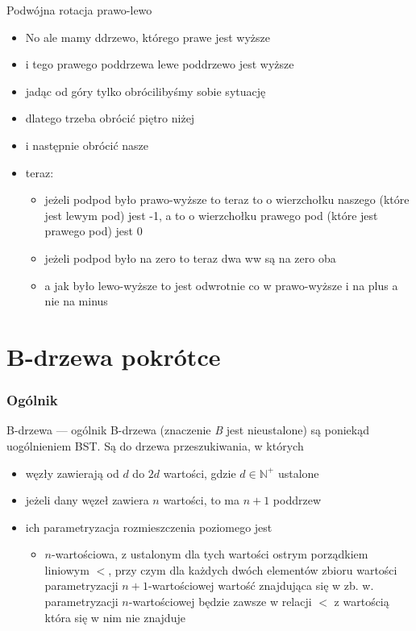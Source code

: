 \documentclass{beamer}
\begin{document}
\begin{frame}{Podwójna rotacja prawo-lewo}
\begin{itemize}
	\item No ale mamy ddrzewo, którego prawe jest wyższe
    \item i tego prawego poddrzewa lewe poddrzewo jest wyższe
    \pause\vskip 0.4cm
    \item jadąc od góry tylko obrócilibyśmy sobie sytuację
    \pause\vskip 0.2cm
    \item dlatego trzeba obrócić piętro niżej
    \item i następnie obrócić nasze
    \pause\vskip 0.4cm
    \item teraz:
    \begin{itemize}
    	\item jeżeli podpod było prawo-wyższe to teraz to o wierzchołku naszego (które jest lewym pod) jest -1, a to o wierzchołku prawego pod (które jest prawego pod) jest 0
        \item jeżeli podpod było na zero to teraz dwa ww są na zero oba
        \item a jak było lewo-wyższe to jest odwrotnie co w prawo-wyższe i na plus a nie na minus
    \end{itemize}
\end{itemize}
\end{frame}

\section{B-drzewa pokrótce}

\subsubsection{Ogólnik}

\begin{frame}{B-drzewa --- ogólnik}
	B-drzewa (znaczenie \textit{B} jest nieustalone) są poniekąd uogólnieniem BST.
    Są do drzewa przeszukiwania, w których
    \begin{itemize}
    	\item węzły zawierają od $d$ do $2d$ wartości, gdzie $d\in\mathbb{N}^+$ ustalone
        \item jeżeli dany węzeł zawiera $n$ wartości, to ma $n+1$ poddrzew
        \item ich parametryzacja rozmieszczenia poziomego jest
        \begin{itemize}
        	\item $n$-wartościowa, z ustalonym dla tych wartości ostrym porządkiem
            liniowym $<$, przy czym dla każdych dwóch elementów zbioru wartości parametryzacji 
            $n+1$-wartościowej wartość znajdująca się w zb. w. parametryzacji
            $n$-wartościowej będzie zawsze w relacji $<$ z wartością która się w
            nim nie znajduje
        \end{itemize}
    \end{itemize}
\end{frame}
\end{document}
